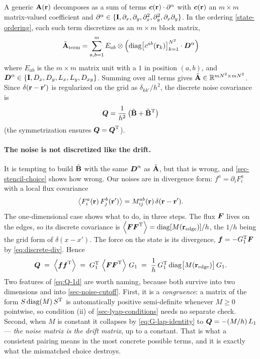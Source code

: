 \documentclass[a5paper]{article}
\begin{document}
A generic $\mathbf{A}(\mathbf{r})$ decomposes as a sum of terms $\boldsymbol c(\mathbf{r})\cdot \partial^\alpha$ with $\boldsymbol c(\mathbf{r})$ an $m\times m$ matrix-valued coefficient and $\partial^\alpha \in\{\boldsymbol{\mathrm{I}}, \partial_x, \partial_y, \partial_x^2, \partial_y^2, \partial_x\partial_y\}$. In the ordering \eqref{state-ordering}, each such term discretizes as an $m\times m$ block matrix,
\begin{align}
    \label{term-assembly}
    \tilde{\mathbf{A}}_{\text{term}} = \sum_{a,b=1}^m E_{ab}\otimes \Big(\mathrm{diag}\big[c^{ab}(\mathbf{r}_k)\big]_{k=1}^{N^2}\cdot \boldsymbol D^\alpha\Big)
\end{align}
where $E_{ab}$ is the $m\times m$ matrix unit with a $1$ in position $(a,b)$, and $\boldsymbol D^\alpha \in \{\boldsymbol{\mathrm{I}},D_x,D_y,L_x,L_y,D_{xy}\}$. Summing over all terms gives $\tilde{\mathbf{A}}\in\mathbb{R}^{mN^2\times mN^2}$. Since $\delta(\mathbf{r}-\mathbf{r}')$ is regularized on the grid as $\delta_{kk'}/h^2$, the discrete noise covariance is
\begin{align}
    \label{Q-matrix}
    \boldsymbol Q = \frac{1}{h^2}\left(\tilde{\mathbf{B}} + \tilde{\mathbf{B}}^{\mathrm{T}}\right)
\end{align}
(the symmetrization ensures $\boldsymbol Q = \boldsymbol Q^{\mathrm{T}}$).

\paragraph{The noise is not discretized like the drift.} It is tempting to build $\tilde{\mathbf{B}}$ with the same $\boldsymbol D^\alpha$ as $\tilde{\mathbf{A}}$, but that is wrong, and \cref{sec-stencil-choice} shows how wrong. Our noises are in divergence form: $f^a = \partial_i F^a_i$ with a local flux covariance
\begin{equation}
    \label{eq:flux-cov}
    \left\langle F^a_i(\mathbf{r})\,F^b_j(\mathbf{r}')\right\rangle = M^{ab}_{ij}(\mathbf{r})\,\delta(\mathbf{r}-\mathbf{r}').
\end{equation}
The one-dimensional case shows what to do, in three steps. The flux $\boldsymbol F$ lives on the edges, so its discrete covariance is $\left\langle\boldsymbol F\boldsymbol F^{\mathrm{T}}\right\rangle = \mathrm{diag}[M(\mathbf{r}_\text{edge})]/h$, the $1/h$ being the grid form of $\delta(x-x')$. The force on the state is its divergence, $\boldsymbol f = -G_1^{\mathrm{T}}\boldsymbol F$ by \eqref{eq:discrete-div}. Hence
\begin{equation}
    \label{eq:Q-1d}
    \boldsymbol Q \;=\; \left\langle\boldsymbol f\boldsymbol f^{\mathrm{T}}\right\rangle
    \;=\; G_1^{\mathrm{T}}\,\left\langle\boldsymbol F\boldsymbol F^{\mathrm{T}}\right\rangle\,G_1
    \;=\; \frac1h\,G_1^{\mathrm{T}}\,\mathrm{diag}\bigl[M(\mathbf{r}_\text{edge})\bigr]\,G_1 .
\end{equation}
Two features of \eqref{eq:Q-1d} are worth naming, because both survive into two dimensions and into \cref{sec-noise-cutoff}. First, it is a \emph{congruence}: a matrix of the form $S\,\mathrm{diag}(M)\,S^{\mathrm{T}}$ is automatically positive semi-definite whenever $M\ge0$ pointwise, so condition (ii) of \cref{sec-lyap-conditions} needs no separate check. Second, when $M$ is constant it collapses by \eqref{eq:G-lap-identity} to $\boldsymbol Q = -(M/h)\,L_1$ --- \emph{the noise matrix is the drift matrix}, up to a constant. That is what a consistent pairing means in the most concrete possible terms, and it is exactly what the mismatched choice destroys.
\end{document}
